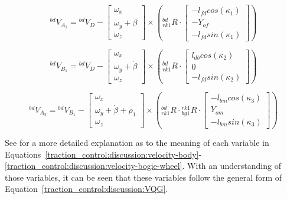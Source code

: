 \begin{equation}\label{traction_control:discussion:velocity-rocker-wheel}
	{}^{bd}V_{A_{1}} = {}^{bd}V_{D} - \left[\begin{array}{c}
		\omega_{x} \\
		\omega_{y} + \dot{\beta} \\
		\omega_{z}
	\end{array}\right] \times \left({}^{bd}_{rk1}R \cdot \left[\begin{array}{c}
		-l_{fd} cos(\kappa_{1}) \\
		-Y_{of} \\
		-l_{fd} sin(\kappa_{1})
	\end{array}\right]\right)
\end{equation}

\begin{equation}\label{traction_control:discussion:velocity-bogie}
	{}^{bd}V_{B_{1}} = {}^{bd}V_{D} - \left[\begin{array}{c}
		\omega_{x} \\
		\omega_{y} + \dot{\beta} \\
		\omega_{z}
	\end{array}\right] \times \left({}^{bd}_{rk1}R \cdot \left[\begin{array}{c}
		l_{db} cos(\kappa_{2}) \\
		0 \\
		-l_{fd} sin(\kappa_{2})
	\end{array}\right]\right)
\end{equation}

\begin{equation}\label{traction_control:discussion:velocity-bogie-wheel}
	{}^{bd}V_{A_{3}} = {}^{bd}V_{B_{1}} - \left[\begin{array}{c}
		\omega_{x} \\
		\omega_{y} + \dot{\beta} + \dot{\rho}_{1} \\
		\omega_{z}
	\end{array}\right] \times \left({}^{bd}_{rk1}R \cdot {}^{rk1}_{bg1}R \cdot \left[\begin{array}{c}
		-l_{bm} cos(\kappa_{3}) \\
		Y_{om} \\
		-l_{bm} sin(\kappa_{3})
	\end{array}\right]\right)
\end{equation}

See \cite{tractl} for a more detailed explanation as to the meaning of each variable in Equations~\ref{traction_control:discussion:velocity-body}-\ref{traction_control:discussion:velocity-bogie-wheel}. With an understanding of those variables, it can be seen that these variables follow the general form of Equation~\ref{traction_control:discussion:VQG}. \\

